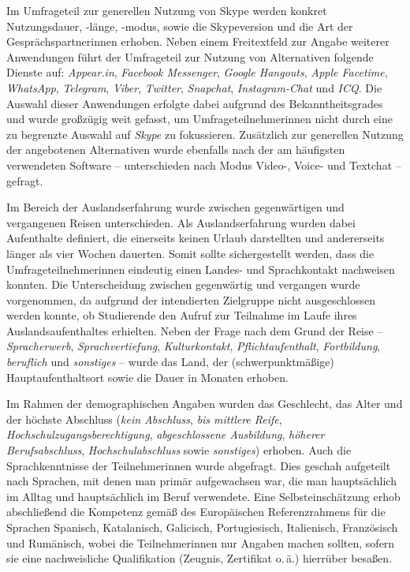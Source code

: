 Im Umfrageteil zur generellen Nutzung von Skype werden konkret Nutzungsdauer, -länge, -modus, sowie die Skypeversion und die Art der Gesprächspartner{\textperiodcentered}innen erhoben. Neben einem Freitextfeld zur Angabe weiterer Anwendungen führt der Umfrageteil zur Nutzung von Alternativen folgende Dienste auf: \emph{Appear.in}, \emph{Facebook Messenger}, \emph{Google Hangouts}, \emph{Apple Facetime}, \emph{WhatsApp}, \emph{Telegram}, \emph{Viber}, \emph{Twitter}, \emph{Snapchat}, \emph{Instagram-Chat} und \emph{ICQ}. Die Auswahl dieser Anwendungen erfolgte dabei aufgrund des Bekanntheitsgrades und wurde großzügig weit gefasst, um Umfrageteilnehmer{\textperiodcentered}innen nicht durch eine zu begrenzte Auswahl auf \emph{Skype} zu fokussieren. Zusätzlich zur generellen Nutzung der angebotenen Alternativen wurde ebenfalls nach der am häufigsten verwendeten Software -- unterschieden nach Modus Video-, Voice- und Textchat -- gefragt.

Im Bereich der Auslandserfahrung wurde zwischen gegenwärtigen und vergangenen Reisen unterschieden. Als Auslandserfahrung wurden dabei Aufenthalte definiert, die einerseits keinen Urlaub darstellten und andererseits länger als vier Wochen dauerten. Somit sollte sichergestellt werden, dass die Umfrageteilnehmer{\textperiodcentered}innen eindeutig einen Landes- und Sprachkontakt nachweisen konnten. Die Unterscheidung zwischen gegenwärtig und vergangen wurde vorgenommen, da aufgrund der intendierten Zielgruppe nicht ausgeschlossen werden konnte, ob Studierende den Aufruf zur Teilnahme im Laufe ihres Auslandsaufenthaltes erhielten. Neben der Frage nach dem Grund der Reise -- \emph{Spracherwerb}, \emph{Sprachvertiefung}, \emph{Kulturkontakt}, \emph{Pflichtaufenthalt}, \emph{Fortbildung}, \emph{beruflich} und  \emph{sonstiges} -- wurde das Land, der (schwerpunktmäßige) Hauptaufenthaltsort sowie die Dauer in Monaten erhoben.

Im Rahmen der demographischen Angaben wurden das Geschlecht, das Alter und der höchste Abschluss (\emph{kein Abschluss}, \emph{bis mittlere Reife}, \emph{Hochschulzugangsberechtigung}, \emph{abgeschlossene Ausbildung}, \emph{höherer Berufsabschluss}, \emph{Hochschulabschluss} sowie \emph{sonstiges}) erhoben. Auch die Sprachkenntnisse der Teilnehmer{\textperiodcentered}\linebreak[3]innen wurde abgefragt. Dies geschah aufgeteilt nach Sprachen, mit denen man primär aufgewachsen war, die man hauptsächlich im Alltag und hauptsächlich im Beruf verwendete. Eine Selbsteinschätzung erhob abschließend die Kompetenz gemäß des Europäischen Referenzrahmens für die Sprachen Spanisch, Katalanisch, Galicisch, Portugiesisch, Italienisch, Französisch und Rumänisch, wobei die Teilnehmer{\textperiodcentered}innen nur Angaben machen sollten, sofern sie eine nachweisliche Qualifikation (Zeugnis, Zertifikat o.\,ä.) hierrüber besaßen.

